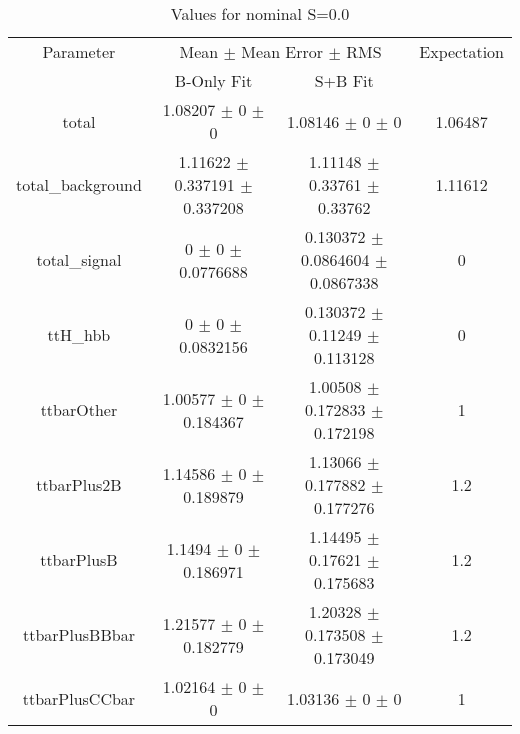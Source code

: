\begin{table}
\centering
\caption{Values for nominal S=0.0}
\begin{tabular}{cccc}
\toprule
Parameter & \multicolumn{2}{c}{Mean $\pm$ Mean Error $\pm$ RMS} & Expectation\\
 & B-Only Fit & S+B Fit & \\
\midrule
total & \num{1.08207} $\pm$ \num{0} $\pm$ \num{0} & \num{1.08146} $\pm$ \num{0} $\pm$ \num{0} & \num{1.06487}\\
total\_background & \num{1.11622} $\pm$ \num{0.337191} $\pm$ \num{0.337208} & \num{1.11148} $\pm$ \num{0.33761} $\pm$ \num{0.33762} & \num{1.11612}\\
total\_signal & \num{0} $\pm$ \num{0} $\pm$ \num{0.0776688} & \num{0.130372} $\pm$ \num{0.0864604} $\pm$ \num{0.0867338} & \num{0}\\
ttH\_hbb & \num{0} $\pm$ \num{0} $\pm$ \num{0.0832156} & \num{0.130372} $\pm$ \num{0.11249} $\pm$ \num{0.113128} & \num{0}\\
ttbarOther & \num{1.00577} $\pm$ \num{0} $\pm$ \num{0.184367} & \num{1.00508} $\pm$ \num{0.172833} $\pm$ \num{0.172198} & \num{1}\\
ttbarPlus2B & \num{1.14586} $\pm$ \num{0} $\pm$ \num{0.189879} & \num{1.13066} $\pm$ \num{0.177882} $\pm$ \num{0.177276} & \num{1.2}\\
ttbarPlusB & \num{1.1494} $\pm$ \num{0} $\pm$ \num{0.186971} & \num{1.14495} $\pm$ \num{0.17621} $\pm$ \num{0.175683} & \num{1.2}\\
ttbarPlusBBbar & \num{1.21577} $\pm$ \num{0} $\pm$ \num{0.182779} & \num{1.20328} $\pm$ \num{0.173508} $\pm$ \num{0.173049} & \num{1.2}\\
ttbarPlusCCbar & \num{1.02164} $\pm$ \num{0} $\pm$ \num{0} & \num{1.03136} $\pm$ \num{0} $\pm$ \num{0} & \num{1}\\
\bottomrule
\end{tabular}
\end{table}